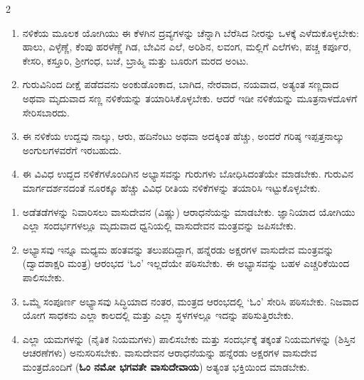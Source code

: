\begin{multicols}{2}
\begin{kan}
\begin{enumerate}[nosep]
\item[25–26.] ನಳಿಕೆಯ ಮೂಲಕ ಯೋಗಿಯು ಈ ಕೆಳಗಿನ ದ್ರವ್ಯಗಳನ್ನು ಚೆನ್ನಾಗಿ ಬೆರೆಸಿದ ನೀರನ್ನು ಒಳಕ್ಕೆ ಎಳೆದುಕೊಳ್ಳಬೇಕು: ಹಾಲು, ಎಳ್ಳೆಣ್ಣೆ, ಕೆಂಪು ಹರಳೆಣ್ಣೆ ಗಿಡ, ಬೇವಿನ ಎಲೆ, ಅರಿಶಿನ, ಲವಂಗ, ಮಲ್ಲಿಗೆ ಎಲೆಗಳು, ಪಚ್ಚ ಕರ್ಪೂರ, ಕೇಸರಿ, ಕಸ್ತೂರಿ, ಶ್ರೀಗಂಧ, ಬಜೆ, ಬ್ರಾಹ್ಮಿ ಮತ್ತು ಬೂರುಗ ಮರದ ಅಂಟು.
\item[27.] ಗುರುವಿನಿಂದ ದೀಕ್ಷೆ ಪಡೆದವನು ಅಂಕುಡೊಂಕಾದ, ಬಾಗಿದ, ನೇರವಾದ, ನಯವಾದ, ಅತ್ಯಂತ ಸಣ್ಣದಾದ ಅಥವಾ ಮೃದುವಾದ ಸಣ್ಣ ನಳಿಕೆಯನ್ನು ತಯಾರಿಸಿಕೊಳ್ಳಬೇಕು. ಆದರೆ ಇಡೀ ನಳಿಕೆಯನ್ನು ಮೂತ್ರನಾಳದೊಳಗೆ ಸೇರಿಸಬಾರದು.
\item[28.] ಈ ನಳಿಕೆಯ ಉದ್ದವು ನಾಲ್ಕು, ಆರು, ಹದಿನೆಂಟು ಅಥವಾ ಅದಕ್ಕಿಂತ ಹೆಚ್ಚು, ಅಂದರೆ ಗರಿಷ್ಠ ಇಪ್ಪತ್ತನಾಲ್ಕು ಅಂಗುಲಗಳವರೆಗೆ ಇರಬಹುದು.
\item[29.] ಈ ವಿವಿಧ ಉದ್ದದ ನಳಿಕೆಗಳೊಂದಿಗಿನ ಅಭ್ಯಾಸವನ್ನು ಗುರುಗಳು ಬೋಧಿಸಿದಂತೆಯೇ ಮಾಡಬೇಕು. ಗುರುವಿನ ಮಾರ್ಗದರ್ಶನದಂತೆ ನೂರಕ್ಕೂ ಹೆಚ್ಚು ವಿವಿಧ ರೀತಿಯ ನಳಿಕೆಗಳನ್ನು ತಯಾರಿಸಿ ಇಟ್ಟುಕೊಳ್ಳಬೇಕು.
\end{enumerate}
\vskip 7pt


\begin{enumerate}[nosep]
\item[30.] ಅಡೆತಡೆಗಳನ್ನು ನಿವಾರಿಸಲು ವಾಸುದೇವನ (ವಿಷ್ಣು) ಆರಾಧನೆಯನ್ನು ಮಾಡಬೇಕು. ಜ್ಞಾನಿಯಾದ ಯೋಗಿಯು ಎಲ್ಲಾ ಸಂದರ್ಭಗಳಲ್ಲೂ ಮೃದುವಾದ ಧ್ವನಿಯಲ್ಲಿ ವಾಸುದೇವನ ಮಂತ್ರವನ್ನು ಜಪಿಸಬೇಕು.
\item[31.] ಅಭ್ಯಾಸವು ಇನ್ನೂ ಮಧ್ಯಮ ಹಂತವನ್ನು ತಲುಪದಿದ್ದಾಗ, ಹನ್ನೆರಡು ಅಕ್ಷರಗಳ ವಾಸುದೇವ ಮಂತ್ರವನ್ನು (ದ್ವಾದಶಾಕ್ಷರಿ ಮಂತ್ರ) ಆರಂಭದ ‘ಓಂ’ ಇಲ್ಲದೆಯೇ ಪಠಿಸಬೇಕು. ಈ ಅಭ್ಯಾಸವನ್ನು ಬಹಳ ಎಚ್ಚರಿಕೆಯಿಂದ ಪಾಲಿಸಬೇಕು.
\item[32.] ಒಮ್ಮೆ ಸಂಪೂರ್ಣ ಅಭ್ಯಾಸವು ಸಿದ್ಧಿಯಾದ ನಂತರ, ಮಂತ್ರದ ಆರಂಭದಲ್ಲಿ ‘ಓಂ’ ಸೇರಿಸಿ ಪಠಿಸಬೇಕು. ನಿಜವಾದ ಯೋಗ ಸಾಧಕನು ಎಲ್ಲಾ ಕಾಲದಲ್ಲಿ ಮತ್ತು ಎಲ್ಲಾ ಸ್ಥಳಗಳಲ್ಲೂ ಇದನ್ನು ಪಠಿಸುತ್ತಿರಬೇಕು.
\item[33.] ಎಲ್ಲಾ ಯಮಗಳನ್ನು (ನೈತಿಕ ನಿಯಮಗಳು) ಪಾಲಿಸಬೇಕು ಮತ್ತು ಸಂದರ್ಭಕ್ಕೆ ತಕ್ಕಂತೆ ನಿಯಮಗಳನ್ನು (ಶಿಸ್ತಿನ ಆಚರಣೆಗಳು) ಅನುಸರಿಸಬೇಕು. ವಾಸುದೇವನ ಆರಾಧನೆಯನ್ನು ಹನ್ನೆರಡು ಅಕ್ಷರಗಳ ವಾಸುದೇವ ಮಂತ್ರದೊಂದಿಗೆ (\textbf{ಓಂ ನಮೋ ಭಗವತೇ ವಾಸುದೇವಾಯ}) ಅತ್ಯಂತ ಭಕ್ತಿಯಿಂದ ಮಾಡಬೇಕು.
\end{enumerate}
\columnbreak



\end{kan}
\end{multicols}
